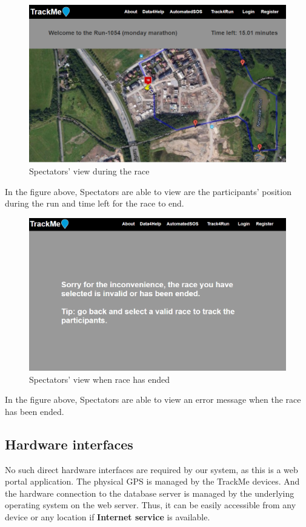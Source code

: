 \documentclass[a4paper, hidelinks, 12pt]{report}
\begin{document}
	\begin{figure}[H]
		\centering
		\includegraphics[scale=0.35]{../Assets/spectators_valid_race.png}\caption[UI: Spectators' view during the race]{Spectators' view during the race}
		\label{fig:Make_Request}
	\end{figure}
	
	In the figure above, Spectators are able to view are the participants' position during the run and time left for the race to end. 
	
	\begin{figure}[H]
		\centering
		\includegraphics[scale=0.35]{../Assets/spectators_invalid_race.png}\caption[UI: Spectators' view when race has ended]{Spectators' view when race has ended}
		\label{fig:Make_Request}
	\end{figure}
	
	In the figure above, Spectators are able to view an error message when the race has been ended. 

	\subsection{Hardware interfaces}
	No such direct hardware interfaces are required by our system, as this is a web portal application. The physical GPS is managed by the TrackMe devices. And the hardware connection to the database server is managed by the underlying operating system on the web server. Thus, it can be easily accessible from any device or any location if \textbf{Internet service} is available.
	
\end{document}

